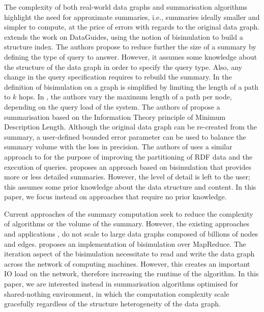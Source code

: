 The complexity of both real-world data graphs and summarisation algorithms highlight the need for approximate summaries, i.e., summaries ideally smaller and simpler to compute, at the price of errors with regards to the original data graph. \cite{Milo:1999:ISP:645503.656266} extends the work on DataGuides, using the notion of bisimulation to build a structure index. The authors propose to reduce further the size of a summary by defining the type of query to answer. However, it assumes some knowledge about the structure of the data graph in order to specify the query type. Also, any change in the query specification requires to rebuild the summary. In \cite{kaushik:de:2002,kaushik:2002:cib} the definition of bisimulation on a graph is simplified by limiting the length of a path to $k$ hops. In \cite{chen:2003:dia}, the authors vary the maximum length of a path per node, depending on the query load of the system. The authors of \cite{navlakha:2008:gsb} propose a summarisation based on the Information Theory principle of Minimum Description Length. Although the original data graph can be re-created from the summary, a user-defined bounded error parameter can be used to balance the summary volume with the loss in precision. The authors of \cite{Tran:2012:kde} uses a similar approach to \cite{kaushik:2002:cib} for the purpose of improving the partitioning of RDF data and the execution of queries. \cite{tian:sigmod:2008} proposes an approach based on bisimulation that provides more or less detailed summaries. However, the level of detail is left to the user; this assumes some  prior knowledge about the data structure and content. In this paper, we focus instead on approaches that require no prior knowledge.

Current approaches of the summary computation seek to reduce the complexity of algorithms or the volume of the summary. However, the existing approaches and applications \cite{DBLP:conf/esws/KhatchadourianC10,jarrar:2012,Christodoulou:2013:SIL:2457317.2457328}, do not scale to large data graphs composed of billions of nodes and edges. \cite{kbisim-map} proposes an implementation of bisimulation over MapReduce. The iteration aspect of the bisimulation necessitate to read and write the data graph across the network of computing machines. However, this creates an important IO load on the network, therefore increasing the runtime of the algorithm. In this paper, we are interested instead in summarisation algorithms optimised for shared-nothing environment, in which the computation complexity scale gracefully regardless of the structure heterogeneity of the data graph.

